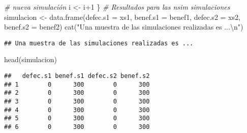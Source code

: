 \documentclass[
]{book}
\newenvironment{Shaded}{\begin{snugshade}}{\end{snugshade}}
\newcommand{\AttributeTok}[1]{\textcolor[rgb]{0.77,0.63,0.00}{#1}}
\newcommand{\CommentTok}[1]{\textcolor[rgb]{0.56,0.35,0.01}{\textit{#1}}}
\newcommand{\DecValTok}[1]{\textcolor[rgb]{0.00,0.00,0.81}{#1}}
\newcommand{\FunctionTok}[1]{\textcolor[rgb]{0.00,0.00,0.00}{#1}}
\newcommand{\NormalTok}[1]{#1}
\newcommand{\OtherTok}[1]{\textcolor[rgb]{0.56,0.35,0.01}{#1}}
\newcommand{\SpecialCharTok}[1]{\textcolor[rgb]{0.00,0.00,0.00}{#1}}
\newcommand{\StringTok}[1]{\textcolor[rgb]{0.31,0.60,0.02}{#1}}
\theoremstyle{definition}
\theoremstyle{definition}
\theoremstyle{definition}
\theoremstyle{definition}
\theoremstyle{remark}
\begin{document}
\begin{Shaded}
\begin{Highlighting}[]
    \CommentTok{\# nueva simulación}
\NormalTok{  i }\OtherTok{\textless{}{-}}\NormalTok{ i}\SpecialCharTok{+}\DecValTok{1}
\NormalTok{\}}
\CommentTok{\# Resultados para las nsim simulaciones}
\NormalTok{simulacion }\OtherTok{\textless{}{-}} \FunctionTok{data.frame}\NormalTok{(}\AttributeTok{defec.s1 =}\NormalTok{ xs1, }\AttributeTok{benef.s1 =}\NormalTok{ benef1, }
                         \AttributeTok{defec.s2 =}\NormalTok{ xs2, }\AttributeTok{benef.s2 =}\NormalTok{ benef2)}
\FunctionTok{cat}\NormalTok{(}\StringTok{"Una muestra de las simulaciones realizadas es ...}\SpecialCharTok{\textbackslash{}n}\StringTok{"}\NormalTok{)}
\end{Highlighting}
\end{Shaded}

\begin{verbatim}
## Una muestra de las simulaciones realizadas es ...
\end{verbatim}

\begin{Shaded}
\begin{Highlighting}[]
\FunctionTok{head}\NormalTok{(simulacion)}
\end{Highlighting}
\end{Shaded}

\begin{verbatim}
##   defec.s1 benef.s1 defec.s2 benef.s2
## 1        0      300        0      300
## 2        0      300        0      300
## 3        0      300        0      300
## 4        0      300        0      300
## 5        0      300        0      300
## 6        0      300        0      300
\end{verbatim}

\begin{Shaded}
\end{Shaded}
\end{document}
